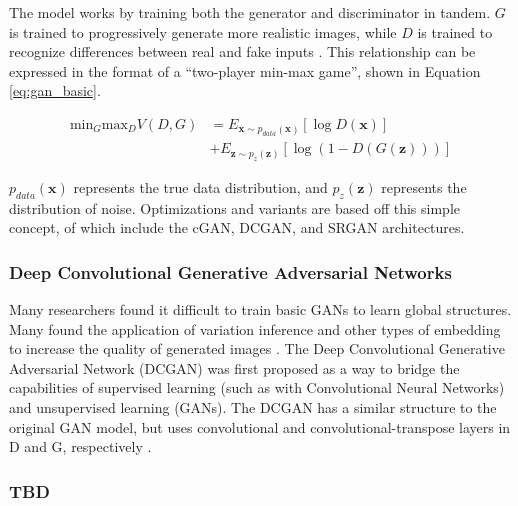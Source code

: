\documentclass[letterpaper]{article} %
\begin{document}
The model works by training both the generator and
discriminator in tandem.
$G$ is trained to progressively generate more realistic images,
while $D$ is trained to recognize differences between real and fake inputs \cite{cgan}.
This relationship can be expressed in the format of a
``two-player min-max game'', shown in Equation \ref{eq:gan_basic}.

\begin{equation}
\label{eq:gan_basic}
\begin{split}
\text{min}_G\text{max}_DV(D,G) &=
E_{\mathbf{x}\sim p_{data}(\mathbf{x})}[\log D(\mathbf{x})] \\
&+ E_{\mathbf{z}\sim p_{z}(\mathbf{z})}[\log(1 - D(G(\mathbf{z})))]
\end{split}
\end{equation}

$p_{data}(\mathbf{x})$ represents the true data distribution,
and $p_{z}(\mathbf{z})$ represents the distribution of noise.
Optimizations and variants are based off this simple concept, of which include
the cGAN, DCGAN, and SRGAN architectures.

\subsubsection{Deep Convolutional Generative Adversarial Networks}
Many researchers found it difficult to train basic GANs to learn global 
structures. Many found the application of variation inference and other types 
of embedding to increase the quality of generated images \cite{varigan}.
The Deep Convolutional Generative Adversarial Network (DCGAN)
was first proposed as a way to bridge the capabilities of supervised learning 
(such as with Convolutional Neural Networks) and unsupervised learning (GANs). 
The DCGAN has a similar structure to the original GAN model, but uses 
convolutional and convolutional-transpose layers in D and G, respectively
\cite{unsupervised_learning}.

\cite{gan_text_to_image}
\cite{deep_visual_descriptions}

\subsubsection{TBD}
\cite{msggan}
\cite{stackgan++}
\end{document}
